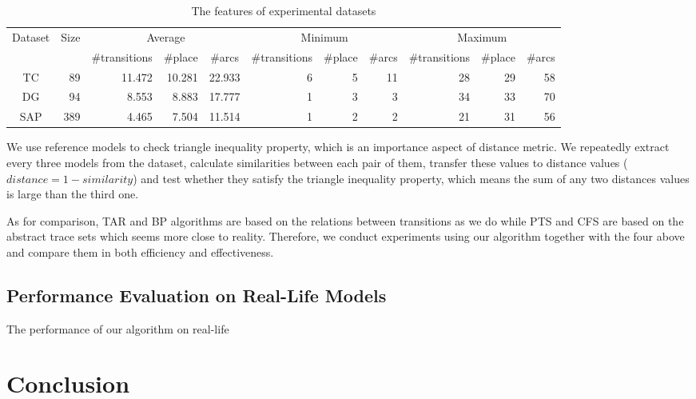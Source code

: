 \documentclass[dvips,...]{llncs}
\begin{document}
\begin{table}[htbp]
\centering
\caption{The features of experimental datasets\label{tab:datasets}}
\scriptsize
\begin{tabular}{|c|r|r|r|r|r|r|r|r|r|r|} \hline
	\multicolumn{1}{|c|}{\multirow{2}{*}{Dataset}} & \multicolumn{1}{c|}{\multirow{2}{*}{Size}} & \multicolumn{3}{|c}{Average} & \multicolumn{3}{|c}{Minimum} & \multicolumn{3}{|c|}{Maximum}\\ \cline{3-11}
	\multicolumn{1}{|c|}{} & \multicolumn{1}{c|}{} & \multicolumn{1}{c|}{\#transitions} & \multicolumn{1}{c|}{\#place} & \multicolumn{1}{c|}{\#arcs} & \multicolumn{1}{c|}{\#transitions} & \multicolumn{1}{c|}{\#place} & \multicolumn{1}{c|}{\#arcs} & \multicolumn{1}{c|}{\#transitions} & \multicolumn{1}{c|}{\#place} & \multicolumn{1}{c|}{\#arcs}\\ \hline
	TC & 89 & 11.472 & 10.281 & 22.933 & 6 & 5 & 11 & 28 & 29 & 58 \\ \hline
	DG & 94 & 8.553 & 8.883 & 17.777 & 1 & 3 & 3 & 34 & 33 & 70 \\ \hline
	SAP & 389 & 4.465 & 7.504 & 11.514 & 1 & 2 & 2 & 21 & 31 & 56 \\ \hline
\end{tabular}
\end{table}

We use reference models to check triangle inequality property, which is an importance aspect of distance metric. We repeatedly extract every three models from the dataset, calculate similarities between each pair of them, transfer these values to distance values ($distance=1-similarity$) and test whether they satisfy the triangle inequality property, which means the sum of any two distances values is large than the third one. 

As for comparison, TAR and BP algorithms are based on the relations between transitions as we do while PTS and CFS are based on the abstract trace sets which seems more close to reality. Therefore, we conduct experiments using our algorithm together with the four above and compare them in both efficiency and effectiveness.

\subsection{Performance Evaluation on Real-Life Models}\label{subsec:performance}
The performance of our algorithm on real-life

\section{Conclusion}\label{sec:conclusion}




\end{document}
